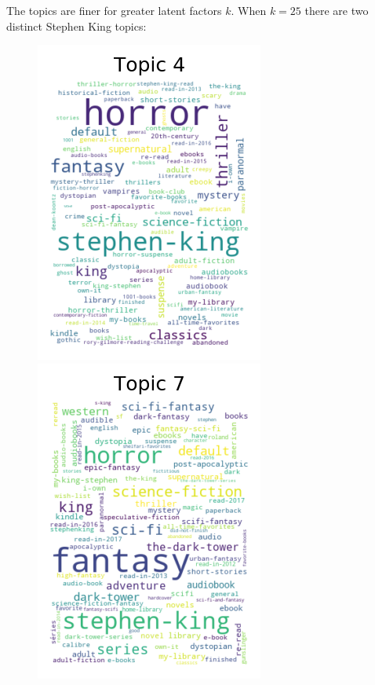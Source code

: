 \documentclass[handout]{beamer}
\begin{document}
\begin{frame}
 The topics are finer for greater latent factors $k$. When $k=25$ there are two distinct Stephen King topics: 
 
 \begin{figure}
\centering
  \includegraphics[width=0.45\linewidth]{../image/goodreads-topics-profiles-recommendations/tag-cloud-25-tall-4.png}
    \includegraphics[width=0.45\linewidth]{../image/goodreads-topics-profiles-recommendations/tag-cloud-25-tall-7.png}
\end{figure}
 
\end{frame}
\end{document}
